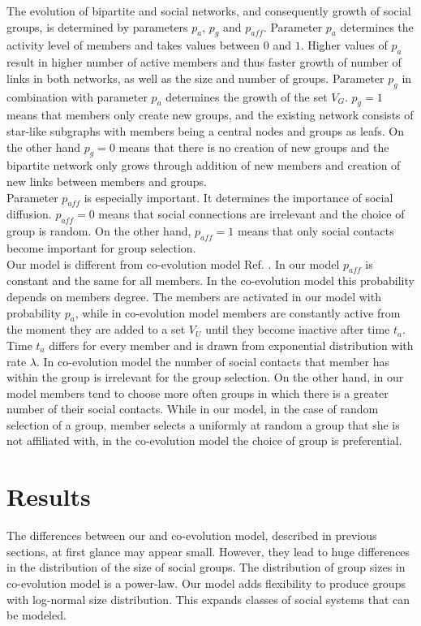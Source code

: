 The evolution of bipartite and social networks, and consequently growth of social groups, is determined by parameters $p_{a}$, $p_{g}$ and $p_{aff}$. Parameter $p_{a}$ determines the activity level of members and takes values between $0$ and $1$. Higher values of $p_{a}$ result in higher number of active members and thus faster growth of number of links in both networks, as well as the size and number of groups. Parameter $p_{g}$ in combination with parameter $p_{a}$ determines the growth of the set $V_{G}$. $p_{g}=1$ means that members only create new groups, and the existing network consists of star-like subgraphs with members being a central nodes and groups as leafs. On the other hand $p_{g}=0$ means that there is no creation of new groups and the bipartite network only grows through addition of new members and creation of new links between members and groups.\\
Parameter $p_{aff}$ is especially important. It determines the importance of social diffusion. $p_{aff}=0$ means that social connections are irrelevant and the choice of group is random. On the other hand, $p_{aff}=1$ means that only social contacts become important for group selection.\\ 
Our model is different from co-evolution model Ref. \cite{zheleva2009co}. In our model $p_{aff}$ is constant and the same for all members. In the co-evolution model this probability depends on members degree. The members are activated in our model with probability $p_{a}$, while in co-evolution model members are constantly active from the moment they are added to a set $V_{U}$ until they become inactive after time $t_{a}$. Time $t_{a}$ differs for every member and is drawn from exponential distribution with rate $\lambda$. In co-evolution model the number of social contacts that member has within the group is irrelevant for the group selection. On the other hand, in our model members tend to choose more often groups in which there is a greater number of their social contacts. While in our model, in the case of random selection of a group, member selects a uniformly at random a group that she is not affiliated with, in the co-evolution model the choice of group is preferential.\\

\section{Results \label{sec:results}}

The differences between our and co-evolution model, described in previous sections, at first glance may appear small. However, they lead to huge differences in the distribution of the size of social groups. The distribution of group sizes in co-evolution model is a power-law. Our model adds flexibility to produce groups with log-normal size distribution. This expands classes of social systems that can be modeled. 

